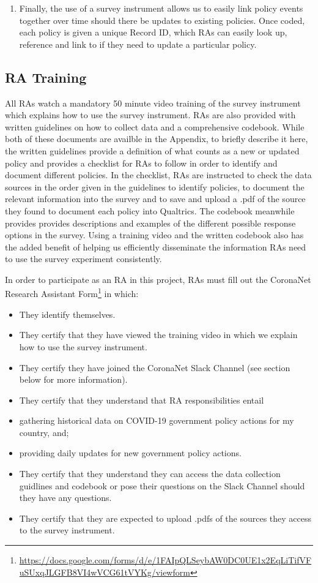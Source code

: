 \documentclass[]{article}
\providecommand{\tightlist}{%
  \setlength{\itemsep}{0pt}\setlength{\parskip}{0pt}}
\let\rmarkdownfootnote\footnote%
\def\footnote{\protect\rmarkdownfootnote}
\begin{document}
\begin{enumerate}
\item
  Finally, the use of a survey instrument allows us to easily link policy events together over time should there be updates to existing policies. Once coded, each policy is given a unique Record ID, which RAs can easily look up, reference and link to if they need to update a particular policy.
\end{enumerate}

\hypertarget{ra-training}{%
\subsection{RA Training}\label{ra-training}}

All RAs watch a mandatory 50 minute video training of the survey instrument which explains how to use the survey instrument. RAs are also provided with written guidelines on how to collect data and a comprehensive codebook. While both of these documents are availble in the Appendix, to briefly describe it here, the written guidelines provide a definition of what counts as a new or updated policy and provides a checklist for RAs to follow in order to identify and document different policies. In the checklist, RAs are instructed to check the data sources in the order given in the guidelines to identify policies, to document the relevant information into the survey and to save and upload a .pdf of the source they found to document each policy into Qualtrics. The codebook meanwhile provides provides descriptions and examples of the different possible response options in the survey. Using a training video and the written codebook also has the added benefit of helping us efficiently disseminate the information RAs need to use the survey experiment consistently.

In order to participate as an RA in this project, RAs must fill out the CoronaNet Research Assistant Form\footnote{\url{https://docs.google.com/forms/d/e/1FAIpQLSeybAW0DC0UE1x2EqLiTifVFuSUxqJLGFB8VI4wVCG61tVYKg/viewform}} in which:

\begin{itemize}
\tightlist
\item
  They identify themselves.
\item
  They certify that they have viewed the training video in which we explain how to use the survey instrument.
\item
  They certify they have joined the CoronaNet Slack Channel (see section below for more information).
\item
  They certify that they understand that RA responsibilities entail
\item
  gathering historical data on COVID-19 government policy actions for my country, and;
\item
  providing daily updates for new government policy actions.
\item
  They certify that they understand they can access the data collection guidlines and codebook or pose their questions on the Slack Channel should they have any questions.
\item
  They certify that they are expected to upload .pdfs of the sources they access to the survey instrument.
\end{itemize}
\end{document}
